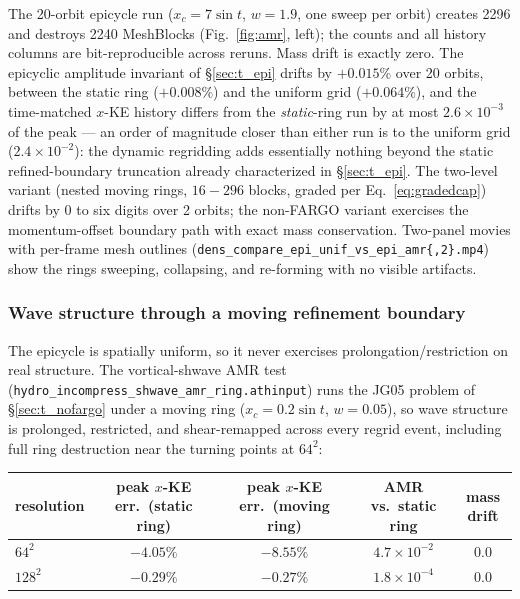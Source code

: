 \documentclass[11pt]{article}
\newcommand{\code}[1]{\texttt{#1}}
\begin{document}
The 20-orbit epicycle run ($x_c = 7\sin t$, $w = 1.9$, one sweep per orbit)
creates 2296 and destroys 2240 MeshBlocks (Fig.~\ref{fig:amr}, left); the counts
and all history columns are bit-reproducible across reruns. Mass drift is exactly
zero. The epicyclic amplitude invariant of \S\ref{sec:t_epi} drifts by $+0.015\%$
over 20 orbits, between the static ring ($+0.008\%$) and the uniform grid
($+0.064\%$), and the time-matched $x$-KE history differs from the
\emph{static}-ring run by at most
$2.6\times10^{-3}$ of the peak --- an order of magnitude closer than either run is
to the uniform grid ($2.4\times10^{-2}$): the dynamic regridding adds essentially
nothing beyond the static refined-boundary truncation already characterized in
\S\ref{sec:t_epi}. The two-level variant (nested moving rings, $16\!-\!296$ blocks,
graded per Eq.~\eqref{eq:gradedcap}) drifts by $0$ to six digits over 2 orbits;
the non-FARGO variant exercises the momentum-offset boundary path with exact mass
conservation. Two-panel movies with per-frame mesh outlines
(\code{dens\_compare\_epi\_unif\_vs\_epi\_amr\{,2\}.mp4}) show the rings sweeping,
collapsing, and re-forming with no visible artifacts.

\subsubsection{Wave structure through a moving refinement boundary}
The epicycle is spatially uniform, so it never exercises prolongation/restriction
on real structure. The vortical-shwave AMR test
(\code{hydro\_incompress\_shwave\_amr\_ring.athinput}) runs the JG05 problem of
\S\ref{sec:t_nofargo} under a moving ring ($x_c = 0.2\sin t$, $w = 0.05$), so wave
structure is prolonged, restricted, and shear-remapped across every regrid event,
including full ring destruction near the turning points at $64^2$:

\begin{center}
\small
\begin{tabular}{@{}lcccc@{}}
\toprule
resolution & peak $x$-KE err.\ (static ring) & peak $x$-KE err.\ (moving ring)
  & AMR vs.\ static ring & mass drift \\
\midrule
$64^2$  & $-4.05\%$ & $-8.55\%$ & $4.7\times10^{-2}$ & $0.0$ \\
$128^2$ & $-0.29\%$ & $-0.27\%$ & $1.8\times10^{-4}$ & $0.0$ \\
\bottomrule
\end{tabular}
\end{center}
\end{document}
